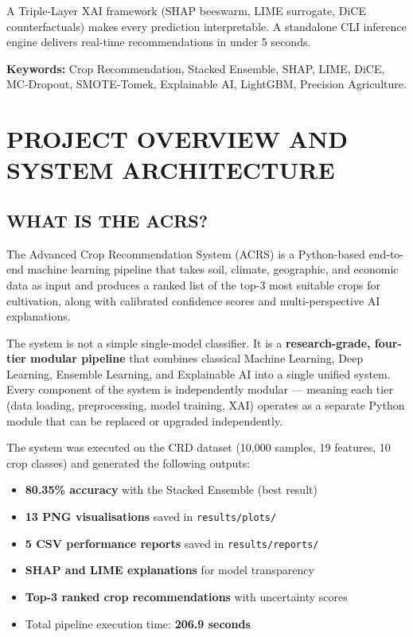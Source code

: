 \documentclass[12pt,a4paper,oneside]{report}
\begin{document}
A Triple-Layer XAI framework (SHAP beeswarm, LIME surrogate, DiCE counterfactuals) makes every prediction interpretable. A standalone CLI inference engine delivers real-time recommendations in under 5 seconds.

\vspace{0.3cm}
\noindent\textbf{Keywords:} Crop Recommendation, Stacked Ensemble, SHAP, LIME, DiCE, MC-Dropout, SMOTE-Tomek, Explainable AI, LightGBM, Precision Agriculture.
\newpage

\tableofcontents\newpage
\listoffigures\newpage
\listoftables\newpage

\setcounter{page}{1}

\chapter{PROJECT OVERVIEW AND SYSTEM ARCHITECTURE}

\section{WHAT IS THE ACRS?}

The Advanced Crop Recommendation System (ACRS) is a Python-based end-to-end machine learning pipeline that takes soil, climate, geographic, and economic data as input and produces a ranked list of the top-3 most suitable crops for cultivation, along with calibrated confidence scores and multi-perspective AI explanations.

The system is not a simple single-model classifier. It is a \textbf{research-grade, four-tier modular pipeline} that combines classical Machine Learning, Deep Learning, Ensemble Learning, and Explainable AI into a single unified system. Every component of the system is independently modular --- meaning each tier (data loading, preprocessing, model training, XAI) operates as a separate Python module that can be replaced or upgraded independently.

The system was executed on the CRD dataset (10,000 samples, 19 features, 10 crop classes) and generated the following outputs:
\begin{itemize}[leftmargin=*, label=$\bullet$]
  \item \textbf{80.35\% accuracy} with the Stacked Ensemble (best result)
  \item \textbf{13 PNG visualisations} saved in \texttt{results/plots/}
  \item \textbf{5 CSV performance reports} saved in \texttt{results/reports/}
  \item \textbf{SHAP and LIME explanations} for model transparency
  \item \textbf{Top-3 ranked crop recommendations} with uncertainty scores
  \item Total pipeline execution time: \textbf{206.9 seconds}
\end{itemize}
\end{document}
